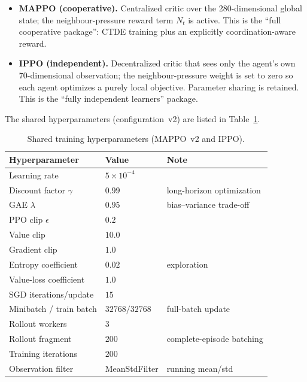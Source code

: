 \begin{itemize}[leftmargin=1.4em]
  \item \textbf{MAPPO (cooperative).} Centralized critic over the 280-dimensional
  global state; the neighbour-pressure reward term $N_t$ is active. This is the
  ``full cooperative package'': CTDE training plus an explicitly coordination-aware
  reward.
  \item \textbf{IPPO (independent).} Decentralized critic that sees only the
  agent's own 70-dimensional observation; the neighbour-pressure weight is set to
  zero so each agent optimizes a purely local objective. Parameter sharing is
  retained. This is the ``fully independent learners'' package.
\end{itemize}

\noindent The shared hyperparameters (configuration~v2) are listed in
Table~\ref{tab:hparams}.

\begin{table}[H]
\centering
\caption{Shared training hyperparameters (MAPPO~v2 and IPPO).}
\label{tab:hparams}
\small
\begin{tabular}{@{}lll@{}}
\toprule
\textbf{Hyperparameter} & \textbf{Value} & \textbf{Note} \\
\midrule
Learning rate            & $5\times10^{-4}$ & \\
Discount factor $\gamma$ & $0.99$           & long-horizon optimization \\
GAE $\lambda$            & $0.95$           & bias--variance trade-off \\
PPO clip $\epsilon$      & $0.2$            & \\
Value clip               & $10.0$           & \\
Gradient clip            & $1.0$            & \\
Entropy coefficient      & $0.02$           & exploration \\
Value-loss coefficient   & $1.0$            & \\
SGD iterations/update    & $15$             & \\
Minibatch / train batch  & $32768 / 32768$  & full-batch update \\
Rollout workers          & $3$              & \\
Rollout fragment         & $200$            & complete-episode batching \\
Training iterations      & $200$            & \\
Observation filter       & MeanStdFilter    & running mean/std \\
\bottomrule
\end{tabular}
\end{table}

